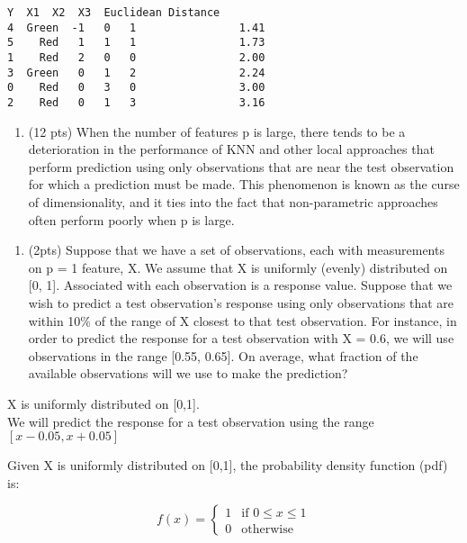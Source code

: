 \documentclass[11pt]{article}
\providecommand{\tightlist}{%
      \setlength{\itemsep}{0pt}\setlength{\parskip}{0pt}}
\begin{document}
    \begin{Verbatim}[commandchars=\\\{\}]
       Y  X1  X2  X3  Euclidean Distance
4  Green  -1   0   1                1.41
5    Red   1   1   1                1.73
1    Red   2   0   0                2.00
3  Green   0   1   2                2.24
0    Red   0   3   0                3.00
2    Red   0   1   3                3.16
    \end{Verbatim}

    \begin{enumerate}
\def\labelenumi{\arabic{enumi}.}
\setcounter{enumi}{2}
\tightlist
\item
  (12 pts) When the number of features p is large, there tends to be a
  deterioration in the performance of KNN and other local approaches
  that perform prediction using only observations that are near the test
  observation for which a prediction must be made. This phenomenon is
  known as the curse of dimensionality, and it ties into the fact that
  non-parametric approaches often perform poorly when p is large.
\end{enumerate}

    \begin{enumerate}
\def\labelenumi{(\alph{enumi})}
\tightlist
\item
  (2pts) Suppose that we have a set of observations, each with
  measurements on p = 1 feature, X. We assume that X is uniformly
  (evenly) distributed on {[}0, 1{]}. Associated with each observation
  is a response value. Suppose that we wish to predict a test
  observation's response using only observations that are within 10\% of
  the range of X closest to that test observation. For instance, in
  order to predict the response for a test observation with X = 0.6, we
  will use observations in the range {[}0.55, 0.65{]}. On average, what
  fraction of the available observations will we use to make the
  prediction?
\end{enumerate}

    X is uniformly distributed on {[}0,1{]}.\\
We will predict the response for a test observation using the range
\([x - 0.05, x + 0.05]\)

Given X is uniformly distributed on {[}0,1{]}, the probability density
function (pdf) is:

\[
f(x) = \begin{cases}
1 & \text{if } 0 \leq x \leq 1 \\
0 & \text{otherwise}
\end{cases}
\]
\end{document}
